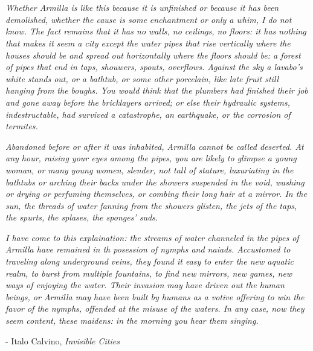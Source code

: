 \section{}

\textit{Whether Armilla is like this because it is unfinished or because it has 
been demolished, whether the cause is some enchantment or only a whim, I do not
know. The fact remains that it has no walls, no ceilings, no floors: it has
nothing that makes it seem a city except the water pipes that rise vertically
where the houses should be and spread out horizontally where the floors should
be: a forest of pipes that end in taps, shouwers, spouts, overflows. Against
the sky a lavabo's white stands out, or a bathtub, or some other porcelain,
like late fruit still hanging from the boughs. You would think that the
plumbers had finished their job and gone away before the bricklayers arrived;
or else their hydraulic systems, indestructable, had survived a catastrophe, an
earthquake, or the corrosion of termites. }

\textit{Abandoned before or after it was inhabited, Armilla cannot be called
deserted. At any hour, raising your eyes among the pipes, you are likely to
glimpse a young woman, or many young women, slender, not tall of stature,
luxuriating in the bathtubs or arching their backs under the showers suspended
in the void, washing or drying or perfuming themselves, or combing their long
hair at a mirror. In the sun, the threads of water fanning from the showers
glisten, the jets of the taps, the spurts, the splases, the sponges' suds. }

\textit{I have come to this explaination: the streams of water channeled in the
pipes of Armilla have remained in th posession of nymphs and naiads. Accustomed
to traveling along underground veins, they found it easy to enter the new
aquatic realm, to burst from multiple fountains, to find new mirrors, new
games, new ways of enjoying the water. Their invasion may have driven out the
human beings, or Armilla may have been built by humans as a votive offering to
win the favor of the nymphs, offended at the misuse of the waters. In any case,
now they seem content, these maidens: in the morning you hear them singing. }

- Italo Calvino, \emph{Invisible Cities}
